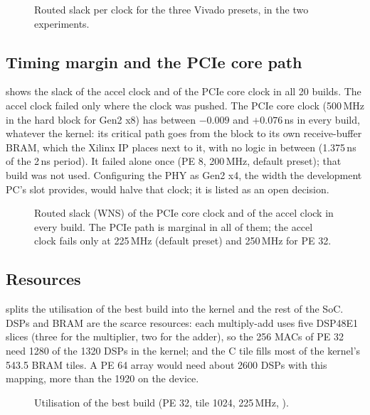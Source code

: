 \begin{figure}[ht]
  \centering
  
  \caption{Routed slack per clock for the three Vivado presets, in the two experiments.}
  \label{fig:presets}
\end{figure}

\subsection{Timing margin and the PCIe core path}
 shows the slack of the accel clock and of the PCIe core clock in all 20 builds. The accel clock
failed only where the clock was pushed. The PCIe core clock (500\,MHz in the hard block for Gen2 x8) has between
\(-0.009\) and \(+0.076\)\,ns in every build, whatever the kernel: its critical path goes from the 
block to its own receive-buffer BRAM, which the Xilinx IP places next to it, with no logic in between (1.375\,ns of
the 2\,ns period). It failed alone once (PE 8, 200\,MHz, default preset); that build was not used. Configuring the
PHY as Gen2 x4, the width the development PC's slot provides, would halve that clock; it is listed as an open decision.

\begin{figure}[ht]
  \centering
  
  \caption{Routed slack (WNS) of the PCIe core clock and of the accel clock in every build. The PCIe path is
    marginal in all of them; the accel clock fails only at 225\,MHz (default preset) and 250\,MHz for PE 32.}
  \label{fig:slack}
\end{figure}

\subsection{Resources}
 splits the utilisation of the best build into the kernel and the rest of the SoC. DSPs and
BRAM are the scarce resources: each multiply-add uses five DSP48E1 slices (three for the multiplier, two for the adder),
so the 256 MACs of PE 32 need 1280 of the 1320 DSPs in the kernel; and the C tile fills most of the kernel's 543.5
BRAM tiles. A PE 64 array would need about 2600 DSPs with this mapping, more than the 1920 on the device.

\begin{figure}[ht]
  \centering
  
  \caption{Utilisation of the best build (PE 32, tile 1024, 225\,MHz, ).}
  \label{fig:resources}
\end{figure}

